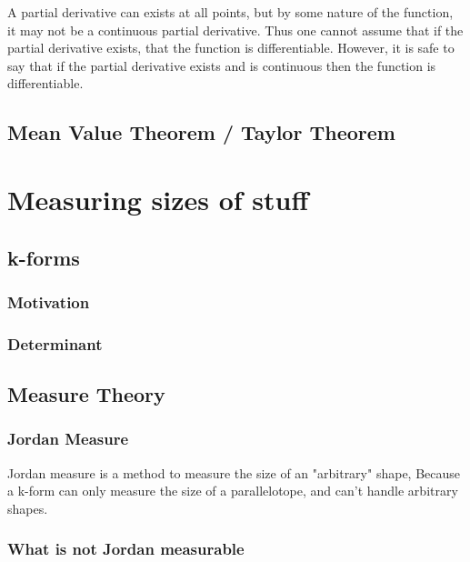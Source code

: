 \documentclass[12pt]{amsart}
\begin{document}
A partial derivative can exists at all points, but by some nature of the
function, it may not be a continuous partial derivative. Thus one cannot assume
that if the partial derivative exists, that the function is differentiable.
However, it is safe to say that if the partial derivative exists and is
continuous then the function is differentiable.

\subsection{Mean Value Theorem / Taylor Theorem}%
\label{sub:mean_value_theorem_taylor_theorem}

\section{Measuring sizes of stuff}%
\label{sec:measuring_sizes_of_stuff}

\subsection{k-forms}%
\label{sub:k_forms}

\subsubsection{Motivation}%
\label{ssub:motivation}

\subsubsection{Determinant}%
\label{ssub:determinant}

\subsection{Measure Theory}%
\label{sub:measure_theory}

\subsubsection{Jordan Measure}%
\label{ssub:jordan_measure}

Jordan measure is a method to measure the size of an "arbitrary" shape, Because
a k-form can only measure the size of a parallelotope, and can't handle
arbitrary shapes.

\subsubsection{What is not Jordan measurable}%
\label{ssub:what_is_not_jordan_measurable}
\end{document}
